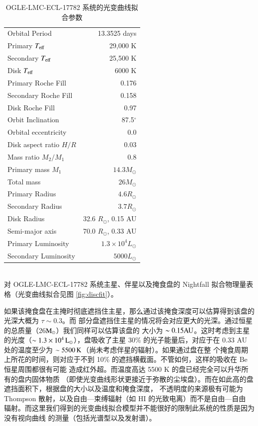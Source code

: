 {\renewcommand{\arraystretch}{1.4}
\begin{table}
\caption{OGLE-LMC-ECL-17782 系统的光变曲线拟合参数}
\label{tbl:discparam}
\centering
\begin{tabularx}{0.9\textwidth}{@{\extracolsep{\fill}}lr}
\hline
Orbital Period & 13.3525 days \\
Primary $T_\mathrm{eff}$  & 29,000  K  \\
Secondary $T_\mathrm{eff}$  & 25,500 K   \\
Disk $T_\mathrm{eff}$  & 6000 K  \\
Primary Roche Fill & 0.176\\
Secondary Roche Fill & 0.158\\
Disk  Roche Fill & 0.97 \\
Orbit Inclination & 87.5$^\circ$ \\
Orbital eccentricity & 0.0 \\
Disk aspect ratio $H/R$  & 0.03 \\
Mass ratio $M_2/M_1$ & 0.8 \\
Primary mass $M_1$     &  $14.3 M_\odot$ \\
Total mass  & $26 M_\odot$ \\
Primary Radius  & $4.6 R_\odot$ \\
Secondary Radius & $3.7 R_\odot$ \\
Disk Radius  & 32.6 $R_\odot$, 0.15 AU \\
Semi-major axis & 70.0 $R_\odot$, 0.33 AU \\
Primary Luminosity & $1.3 \times 10^4 L_\odot $\\ 
Secondary Luminosity & $5000 L_\odot $\\ 
\hline
\end{tabularx}
\medskip \\
对 OGLE-LMC-ECL-17782 系统主星、伴星以及掩食盘的 Nightfall 拟合物理量表格（光变曲线拟合见图 \ref{fig:discfit}）。
\end{table}
}

如果该掩食盘在主掩时彻底遮挡住主星，那么通过该掩食深度可以估算得到该盘的光深大概为 $\tau \sim 0.3$。而
部分盘遮挡住主星的情况将会对应更大的光深。通过恒星的总质量（26$\mathrm{M}_\odot$）我们同样可以估算该盘的
大小为 $\sim 0.15\mathrm{AU}$。这时考虑到主星的光度（$\sim  1.3\times 10^4\,\rm{L_\odot}$），盘吸收了主星 30\% 
的光子能量后，对应于在 0.33 AU 处的温度至少为 $\sim 5500\,\mathrm{K}$（尚未考虑伴星的辐射）。如果通过盘在整
个掩食周期上所花的时间，则对应于不到 10\% 的遮挡横截面。不管如何，这样的吸收在 Be 恒星周围都很有可能
造成红外超\cite{Waters1988,Dougherty1994}。而温度高达 5500 K 的盘已经完全可以升华所有的盘内固体物质
（即使光变曲线形状更接近于弥散的尘埃盘）。而在如此高的盘遮挡面积下，根据盘的大小以及温度和掩食深度，
不透明度的来源极有可能为 Thompson 散射，以及自由---束缚辐射（如 H\textsc{I} 的光致电离）而不是自由---自由
辐射\cite{Rivinius2013}。而这里我们得到的光变曲线拟合模型并不能很好的限制此系统的性质是因为没有视向曲线
的测量（包括光谱型以及发射谱）。

